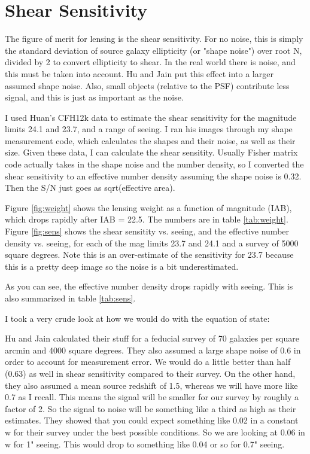 \documentclass[preprint]{aastex}
\begin{document}

\section{Shear Sensitivity}

The figure of merit for lensing is the shear sensitivity.  For no noise, this
is simply the standard deviation of source galaxy ellipticity (or "shape
noise") over root N, divided by 2 to convert ellipticity to shear.  In the real
world there is noise, and this must be taken into account.  Hu and Jain put
this effect into a larger assumed shape noise.  Also, small objects (relative
to the PSF) contribute less signal, and this is just as important as the noise.

I used Huan's CFH12k data to estimate the shear sensitivity for the magnitude
limits 24.1 and 23.7, and a range of seeing.  I ran his images through my shape
measurement code, which calculates the shapes and their noise, as well as their
size.  Given these data, I can calculate the shear sensitity.  Usually Fisher
matrix code actually takes in the shape noise and the number density, so I
converted the shear sensitivity to an effective number density assuming the
shape noise is 0.32.  Then the S/N just goes as sqrt(effective area).

Figure \ref{fig:weight} shows the lensing weight as a function of magnitude
(IAB), which drops rapidly after IAB = 22.5. The numbers are in table
\ref{tab:weight}. Figure \ref{fig:sens} shows the shear sensitity vs. seeing,
and the effective number density vs. seeing, for each of the mag limits 23.7
and 24.1 and a survey of 5000 square degrees.  Note this is an over-estimate of
the sensitivity for 23.7 because this is a pretty deep image so the noise is a
bit underestimated.

As you can see, the effective number density drops rapidly with seeing.
This is also summarized in table \ref{tab:sens}.

I took a very crude look at how we would do with the equation of state:

Hu and Jain calculated their stuff for a feducial survey of 70 galaxies per
square arcmin and 4000 square degrees.  They also assumed a large shape noise
of 0.6 in order to account for measurement error.  We would do a little better
than half (0.63) as well in shear sensitivity compared to their survey.  On the
other hand, they also assumed a mean source redshift of 1.5, whereas we will
have more like 0.7 as I recall.  This means the signal will be smaller for our
survey by roughly a factor of 2.  So the signal to noise will be something like
a third as high as their estimates.  They showed that you could expect
something like 0.02 in a constant w for their survey under the best possible
conditions. So we are looking at 0.06 in w for 1" seeing.  This would drop
to something like 0.04 or so for 0.7" seeing.
\end{document}

